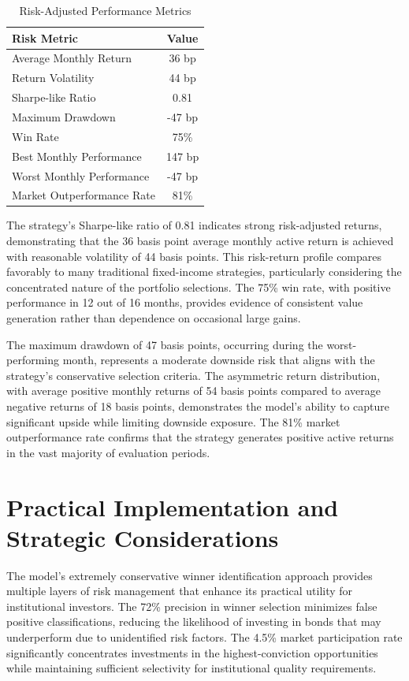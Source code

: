 \begin{table}[htbp]
\centering
\caption{Risk-Adjusted Performance Metrics}
\label{tab:risk_metrics}
\begin{tabular}{lc}
\hline
\textbf{Risk Metric} & \textbf{Value} \\
\hline
Average Monthly Return & 36 bp \\
Return Volatility & 44 bp \\
Sharpe-like Ratio & 0.81 \\
Maximum Drawdown & -47 bp \\
Win Rate & 75\% \\
Best Monthly Performance & 147 bp \\
Worst Monthly Performance & -47 bp \\
Market Outperformance Rate & 81\% \\
\hline
\end{tabular}
\end{table}

The strategy's Sharpe-like ratio of 0.81 indicates strong risk-adjusted returns, demonstrating that the 36 basis point average monthly active return is achieved with reasonable volatility of 44 basis points. This risk-return profile compares favorably to many traditional fixed-income strategies, particularly considering the concentrated nature of the portfolio selections. The 75\% win rate, with positive performance in 12 out of 16 months, provides evidence of consistent value generation rather than dependence on occasional large gains.

The maximum drawdown of 47 basis points, occurring during the worst-performing month, represents a moderate downside risk that aligns with the strategy's conservative selection criteria. The asymmetric return distribution, with average positive monthly returns of 54 basis points compared to average negative returns of 18 basis points, demonstrates the model's ability to capture significant upside while limiting downside exposure. The 81\% market outperformance rate confirms that the strategy generates positive active returns in the vast majority of evaluation periods.

\section{Practical Implementation and Strategic Considerations}

The model's extremely conservative winner identification approach provides multiple layers of risk management that enhance its practical utility for institutional investors. The 72\% precision in winner selection minimizes false positive classifications, reducing the likelihood of investing in bonds that may underperform due to unidentified risk factors. The 4.5\% market participation rate significantly concentrates investments in the highest-conviction opportunities while maintaining sufficient selectivity for institutional quality requirements.

